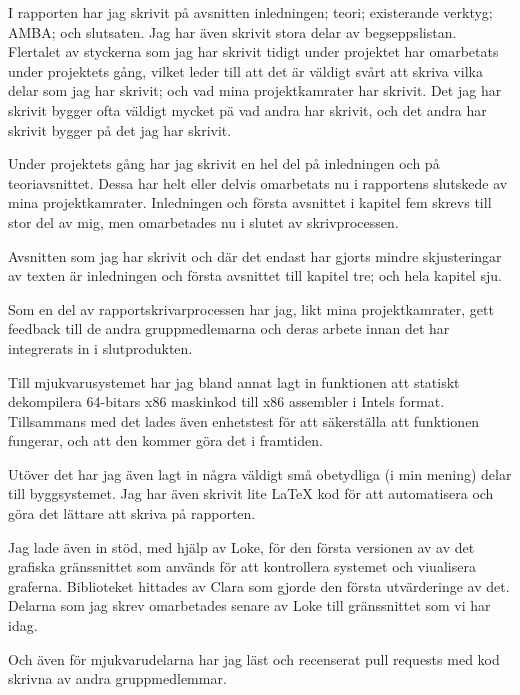 I rapporten har jag skrivit på avsnitten inledningen; teori; existerande
verktyg; AMBA; och slutsaten. Jag har även skrivit stora delar av
begseppslistan. Flertalet av styckerna som jag har skrivit tidigt under
projektet har omarbetats under projektets gång, vilket leder till att det
är väldigt svårt att skriva vilka delar som jag har skrivit; och vad mina
projektkamrater har skrivit. Det jag har skrivit bygger ofta väldigt mycket pä
vad andra har skrivit, och det andra har skrivit bygger på det jag har skrivit.

Under projektets gång har jag skrivit en hel del på inledningen och på
teoriavsnittet. Dessa har helt eller delvis omarbetats nu i rapportens slutskede
av mina projektkamrater. Inledningen och första avsnittet i kapitel fem skrevs
till stor del av mig, men omarbetades nu i slutet av skrivprocessen.

Avsnitten som jag har skrivit och där det endast har gjorts mindre skjusteringar
av texten är inledningen och första avsnittet till kapitel tre; och hela kapitel sju.

Som en del av rapportskrivarprocessen har jag, likt mina projektkamrater,
gett feedback till de andra gruppmedlemarna och deras arbete innan det har
integrerats in i slutprodukten.

Till mjukvarusystemet har jag bland annat lagt in funktionen att statiskt
dekompilera 64-bitars x86 maskinkod till x86 assembler i Intels format.
Tillsammans med det lades även enhetstest för att säkerställa att funktionen
fungerar, och att den kommer göra det i framtiden.

Utöver det har jag även lagt in några väldigt små obetydliga (i min mening)
delar till byggsystemet. Jag har även skrivit lite \LaTeX{} kod för att
automatisera och göra det lättare att skriva på rapporten.

Jag lade även in stöd, med hjälp av Loke, för den första versionen av av det
grafiska gränssnittet som används för att kontrollera systemet och viualisera
graferna. Biblioteket hittades av Clara som gjorde den första utvärderinge av
det. Delarna som jag skrev omarbetades senare av Loke till gränssnittet som vi
har idag.

Och även för mjukvarudelarna har jag läst och recenserat pull requests med kod
skrivna av andra gruppmedlemmar.